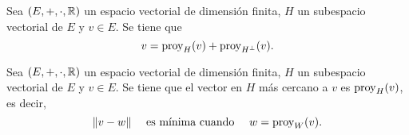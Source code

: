 \documentclass[a4,11pt]{aleph-notas}
\begin{document}
\begin{teo}
    Sea $(E,+,\cdot,\mathbb{R})$ un espacio vectorial de dimensión finita, $H$ un subespacio vectorial de $E$ y $v \in E$. Se tiene que
    \[
        v = \operatorname{proy}_H( v) + \operatorname{proy}_{H^\perp}( v).
    \]
\end{teo}

\begin{teo}
    Sea $(E,+,\cdot,\mathbb{R})$ un espacio vectorial de dimensión finita, $H$ un subespacio vectorial de $E$ y $v \in E$. Se tiene que el vector en $H$ más cercano a $v$ es $\operatorname{proy}_H(v)$, es decir,
    \[
    \|v-w\| \quad \text{ es mínima cuando } \quad w = \operatorname{proy}_W(v).
    \]
\end{teo}
\end{document}
